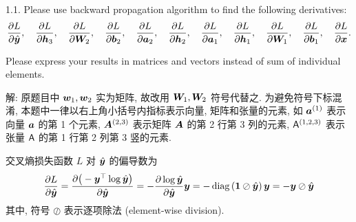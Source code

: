 \documentclass{article}
\begin{document}
1.1. Please use backward propagation algorithm to find the following derivatives:
\begin{equation}
  \frac{\partial L}{\partial \hat{\bm{y}}},\quad\frac{\partial L}{\partial \bm{h}_3},\quad\frac{\partial L}{\partial \bm{W}_2},\quad\frac{\partial L}{\partial \bm{b}_2},\quad\frac{\partial L}{\partial \bm{a}_2},\quad\frac{\partial L}{\partial \bm{h}_2},\quad\frac{\partial L}{\partial \bm{a}_1},\quad\frac{\partial L}{\partial \bm{h}_1},\quad\frac{\partial L}{\partial \bm{W}_1},\quad\frac{\partial L}{\partial \bm{b}_1},\quad\frac{\partial L}{\partial \bm{x}}.
\end{equation}

Please express your results in matrices and vectors instead of sum of individual elements.

解: 原题目中 $\bm{w}_1,\bm{w}_2$ 实为矩阵, 故改用 $\bm{W}_1,\bm{W}_2$ 符号代替之. 为避免符号下标混淆, 本题中一律以右上角小括号内指标表示向量, 矩阵和张量的元素, 如 $\bm{a}^{(1)}$ 表示向量 $\bm{a}$ 的第 1 个元素, $\bm{A}^{(2,3)}$ 表示矩阵 $\bm{A}$ 的第 2 行第 3 列的元素, $\mathsf{A}^{(1,2,3)}$ 表示张量 $\mathsf{A}$ 的第 1 行第 2 列第 3 竖的元素.

交叉熵损失函数 $L$ 对 $\hat{\bm{y}}$ 的偏导数为
\begin{equation}
  \begin{aligned}
    \frac{\partial L}{\partial \hat{\bm{y}}}
    =\frac{\partial\big(-\bm{y}^\top\log\hat{\bm{y}}\big)}{\partial \hat{\bm{y}}}
    =-\frac{\partial\log\hat{\bm{y}}}{\partial\hat{\bm{y}}}\bm{y}
    =-\operatorname{diag}\left(\bm{1}\oslash\hat{\bm{y}}\right)\bm{y}
    =-\bm{y}\oslash\hat{\bm{y}}
  \end{aligned}
\end{equation}
其中, 符号 $\oslash$ 表示逐项除法 (element-wise division).
\end{document}
